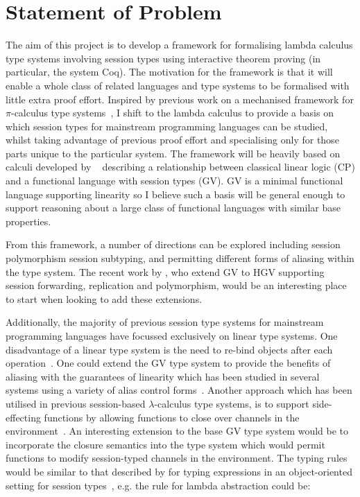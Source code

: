 \documentclass{mprop}
\newcommand{\1}{\textbf{1}\xspace}
\begin{document}
\section{Statement of Problem}

The aim of this project is to develop a framework for formalising lambda
calculus type systems involving session types using interactive theorem
proving (in particular, the system Coq). The motivation for the framework is
that it will enable a whole class of related languages and type systems to be
formalised with little extra proof effort. Inspired by previous work on a
mechanised framework for $\pi$-calculus type systems~\cite{Gay:2001:FFP}, I
shift to the lambda calculus to provide a basis on which session types for
mainstream programming languages can be studied, whilst taking advantage of
previous proof effort and specialising only for those parts unique to the
particular system. The framework will be heavily based on calculi developed by
\citeauthor{Wadler:2012}~\cite{Wadler:2012} describing a relationship between
classical linear logic (CP) and a functional language with session types
(GV). GV is a minimal functional language supporting linearity so I believe
such a basis will be general enough to support reasoning about a large class
of functional languages with similar base properties.

From this framework, a number of directions can be explored including session
polymorphism session subtyping, and permitting different forms of aliasing
within the type system. The recent work by \citeauthor{Lindley:2014:SAP}
\cite{Lindley:2014:SAP}, who extend GV to HGV supporting session forwarding,
replication and polymorphism, would be an interesting place to start when
looking to add these extensions.

Additionally, the majority of previous session type systems for mainstream programming languages have focussed exclusively on linear type systems. One disadvantage of a linear type system is the need to re-bind objects after each operation~\cite{Gay:2010:LAST}. One could extend the GV type system to provide the benefits of aliasing with the guarantees of linearity which has been studied in several systems using a variety of alias control forms~\cite{Fahndrich:2002,Mazurak:2010:LLT,Tov:2011}. Another approach which has been utilised in previous session-based $\lambda$-calculus type systems, is to support side-effecting functions by allowing functions to close over channels in the environment~\cite{Gay:2003:STI,Vasconcelos:2006:TCM}. An interesting extension to the base GV type system would be to incorporate the closure semantics into the type system which would permit functions to modify session-typed channels in the environment. The typing rules would be similar to that described by \citeauthor{Gay:2010:MST} for typing expressions in an object-oriented setting for session types~\cite{Gay:2010:MST}, e.g. the rule for lambda abstraction could be:
\end{document}
